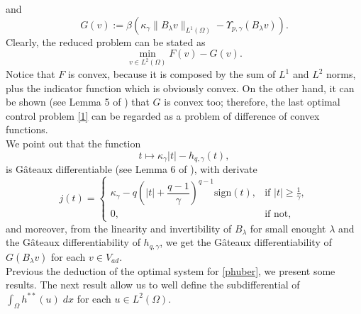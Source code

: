 \documentclass[11pt,a4paper]{amsart}
\renewcommand{\l}{\left}
\renewcommand{\r}{\right}
\newcommand{\om}{\Omega}
\newcommand{\sign}{\mathrm{sign}}
\newcommand{\norm}[1]{\lVert #1 \rVert}
\begin{document}
and
\begin{equation}\label{convexII}
	G(v):=\beta \l(\kappa_{\gamma}\norm{B_{\lambda}v}_{L^{1}(\om)}-\Upsilon_{p,\gamma}(B_{\lambda}v)\r).
\end{equation}
Clearly, the reduced problem can be stated as
\begin{equation}\label{1}
    	\min_{v\in L^2(\om)} F(v)-G(v).
\end{equation}
Notice that $F$ is convex, because it is composed by the sum of $L^1$ and $L^2$ norms, plus the indicator function which is obviously convex. On the other hand, it can be shown (see Lemma 5 of \cite{merino}) that $G$ is convex too; therefore, the last optimal control problem \eqref{1} can be regarded as a problem of difference of convex functions.\\

We point out that the function
 \[
        t\mapsto \kappa_{\gamma}|t|-h_{q,\gamma}(t),
    \]
is Gâteaux differentiable (see Lemma 6 of \cite{merino}), with derivate
 \begin{equation}\label{j}
        j(t)=\begin{cases}
            \kappa_{\gamma}-q\l(|t|+\dfrac{q-1}{\gamma}\r)^{q-1}\sign(t), & \mbox{if }|t|\ge \frac{1}{\gamma},\\
            0, &\mbox{if not},
        \end{cases}
    \end{equation}
    and moreover, from the linearity and invertibility of $B_{\lambda}$ for small enought $\lambda$ and the Gâteaux differentiability of $h_{q,\gamma}$, we get the Gâteaux differentiability of $G(B_{\lambda}v)$ for each $v\in V_{ad}$.\\
    
 Previous the deduction of the optimal system for \eqref{phuber}, we present some results. The next result allow us to well define the subdifferential of $\int_{\om} h^{**}(u)\; dx$ for each $u\in L^2(\om)$.
\end{document}
